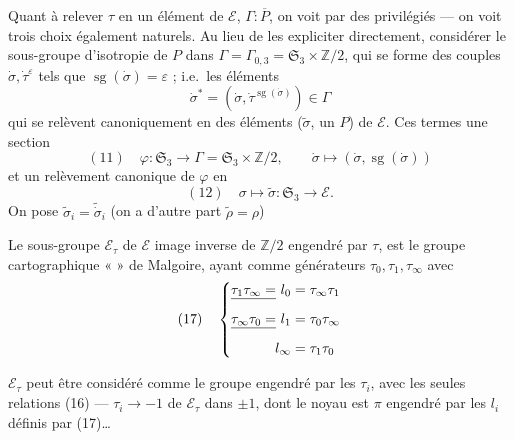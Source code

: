 \documentclass[11pt,a4paper]{article}
\begin{document}
Quant à relever $\tau$ en un élément de $\mathcal{E}$, 
$\Gamma : \overline{P}$, on voit par des  privilégiés --- on
voit trois choix également naturels. Au lieu de les expliciter directement,
 considérer le sous-groupe d'isotropie de
$P$ dans $\Gamma = \Gamma_{0,3} = \mathfrak{S}_3 \times \mathbb{Z}/2$, qui se
forme des couples $\dot\sigma, \dot\tau^{\varepsilon}$ tels que
$\operatorname{sg}(\dot\sigma) = \varepsilon$ ; 
i.e.\ les éléments
\[
\dot\sigma^{*} = (\dot\sigma, \dot\tau^{\operatorname{sg}(\dot\sigma)}) \in \Gamma
\]
qui se relèvent canoniquement en des éléments ($\tilde\sigma$, 
un $P$) de $\mathcal{E}$. Ces termes  une section
\[
(11)\quad
\varphi : \mathfrak{S}_3 \longrightarrow \Gamma = \mathfrak{S}_3 \times \mathbb{Z}/2,
\qquad \dot\sigma \longmapsto (\dot\sigma, \operatorname{sg}(\dot\sigma))
\]
et un relèvement canonique de $\varphi$ en
\[
(12)\quad \sigma \longmapsto \tilde\sigma : \mathfrak{S}_3 \longrightarrow \mathcal{E} .
\]
On pose $\tilde\sigma_i = \tilde{\dot\sigma}_i$ (on a d'autre part
\struck{\ill{}} $\tilde\rho = \rho$)


Le sous-groupe $\mathcal{E}_\tau$ de $\mathcal{E}$ image inverse de $\mathbb{Z}/2$
engendré par $\tau$, est le groupe cartographique « \ill{} \ill{} » de
Malgoire, ayant comme générateurs $\tau_0, \tau_1, \tau_\infty$
 avec
\[
(17)\quad
\left\{
\begin{aligned}
\struck{\tau_1\tau_\infty =}\ l_0 &= \tau_\infty\tau_1\\
\struck{\tau_\infty\tau_0 =}\ l_1 &= \tau_0\tau_\infty\\
l_\infty &= \tau_1\tau_0
\end{aligned}
\right.
\]

$\mathcal{E}_\tau$ peut être considéré comme le groupe engendré par les $\tau_i$,
avec les seules relations (16) --- \ill{} \ill{} \ill{} $\tau_i \to -1$ de
$\mathcal{E}_\tau$ dans $\pm 1$, dont le noyau est $\pi$ engendré par les $l_i$
définis par (17)…
\end{document}
